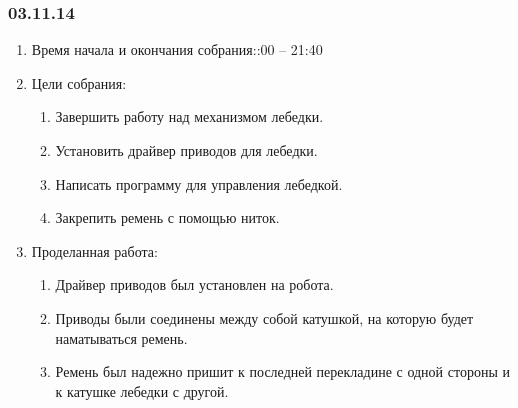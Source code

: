 	
\subsubsection{03.11.14}

\begin{enumerate}
	\item Время начала и окончания собрания::00 – 21:40
	\item Цели собрания:\newline
	\begin{enumerate}
	  \item	Завершить работу над механизмом лебедки.\newline
	  
	  \item	Установить драйвер приводов для лебедки.\newline
	  
	  \item	Написать программу для управления лебедкой.\newline
	  
	  \item	Закрепить ремень с помощью ниток.\newline
	  
    \end{enumerate}
    
	\item Проделанная работа:\newline
	\begin{enumerate}
	  \item	Драйвер приводов был установлен на робота.\newline
      
      \item	Приводы были соединены между собой катушкой, на которую будет наматываться ремень.\newline
      
      \item	Ремень был надежно пришит к последней перекладине с одной стороны и к катушке лебедки с другой.\newline
      

\end{enumerate}
\end{enumerate}
